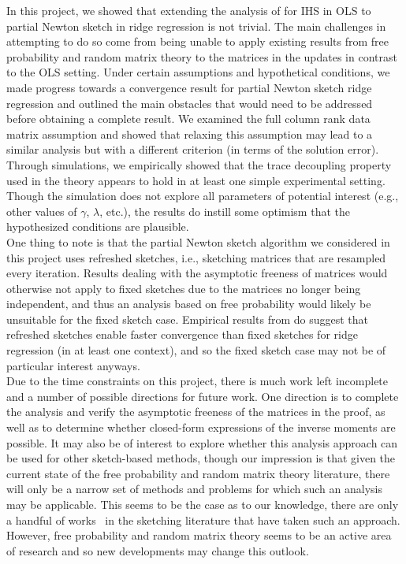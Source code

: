 In this project, we showed that extending the analysis of \citet{Lacotte:2020} for IHS in OLS to partial Newton sketch in ridge regression is not trivial. The main challenges in attempting to do so come from being unable to apply existing results from free probability and random matrix theory to the matrices in the updates in contrast to the OLS setting. Under certain assumptions and hypothetical conditions, we made progress towards a convergence result for partial Newton sketch ridge regression and outlined the main obstacles that would need to be addressed before obtaining a complete result. We examined the full column rank data matrix assumption and showed that relaxing this assumption may lead to a similar analysis but with a different criterion (in terms of the solution error). Through simulations, we empirically showed that the trace decoupling property used in the theory appears to hold in at least one simple experimental setting. Though the simulation does not explore all parameters of potential interest (e.g., other values of $\gamma$, $\lambda$, etc.), the results do instill some optimism that the hypothesized conditions are plausible.
\\

One thing to note is that the partial Newton sketch algorithm we considered in this project uses refreshed sketches, i.e., sketching matrices that are resampled every iteration. Results dealing with the asymptotic freeness of matrices would otherwise not apply to fixed sketches due to the matrices no longer being independent, and thus an analysis based on free probability would likely be unsuitable for the fixed sketch case. Empirical results from \citet{Chowdhury:2018} do suggest that refreshed sketches enable faster convergence than fixed sketches for ridge regression (in at least one context), and so the fixed sketch case may not be of particular interest anyways.
\\

Due to the time constraints on this project, there is much work left incomplete and a number of possible directions for future work. One direction is to complete the analysis and verify the asymptotic freeness of the matrices in the proof, as well as to determine whether closed-form expressions of the inverse moments are possible. It may also be of interest to explore whether this analysis approach can be used for other sketch-based methods, though our impression is that given the current state of the free probability and random matrix theory literature, there will only be a narrow set of methods and problems for which such an analysis may be applicable. This seems to be the case as to our knowledge, there are only a handful of works~\citep{Dobriban:2019,Lacotte:2020,Lacotte:2020b} in the sketching literature that have taken such an approach. However, free probability and random matrix theory seems to be an active area of research and so new developments may change this outlook.
